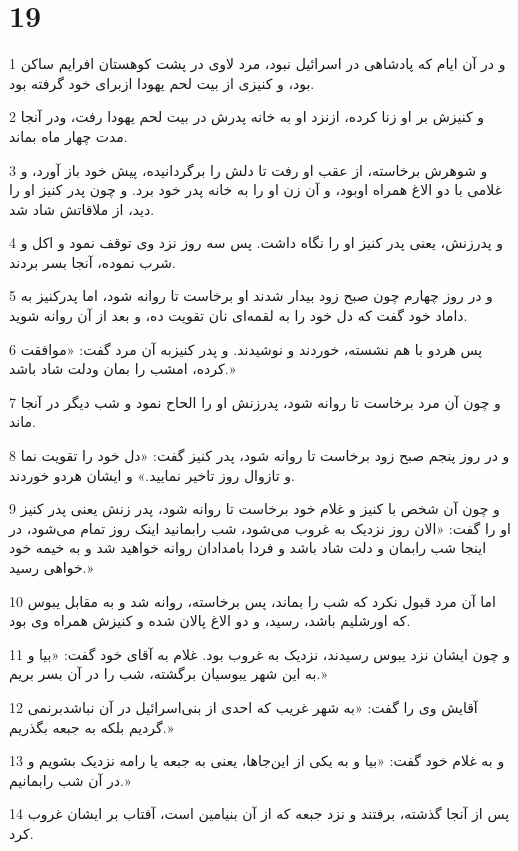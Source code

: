 \chapter{19}

\par 1 و در آن ایام که پادشاهی در اسرائیل نبود، مرد لاوی در پشت کوهستان افرایم ساکن بود، و کنیزی از بیت لحم یهودا ازبرای خود گرفته بود.
\par 2 و کنیزش بر او زنا کرده، ازنزد او به خانه پدرش در بیت لحم یهودا رفت، ودر آنجا مدت چهار ماه بماند.
\par 3 و شوهرش برخاسته، از عقب او رفت تا دلش را برگردانیده، پیش خود باز آورد، و غلامی با دو الاغ همراه اوبود، و آن زن او را به خانه پدر خود برد. و چون پدر کنیز او را دید، از ملاقاتش شاد شد.
\par 4 و پدرزنش، یعنی پدر کنیز او را نگاه داشت. پس سه روز نزد وی توقف نمود و اکل و شرب نموده، آنجا بسر بردند.
\par 5 و در روز چهارم چون صبح زود بیدار شدند او برخاست تا روانه شود، اما پدرکنیز به داماد خود گفت که دل خود را به لقمه‌ای نان تقویت ده، و بعد از آن روانه شوید.
\par 6 پس هردو با هم نشسته، خوردند و نوشیدند. و پدر کنیزبه آن مرد گفت: «موافقت کرده، امشب را بمان ودلت شاد باشد.»
\par 7 و چون آن مرد برخاست تا روانه شود، پدرزنش او را الحاح نمود و شب دیگر در آنجا ماند.
\par 8 و در روز پنجم صبح زود برخاست تا روانه شود، پدر کنیز گفت: «دل خود را تقویت نما و تازوال روز تاخیر نمایید.» و ایشان هردو خوردند.
\par 9 و چون آن شخص با کنیز و غلام خود برخاست تا روانه شود، پدر زنش یعنی پدر کنیز او را گفت: «الان روز نزدیک به غروب می‌شود، شب رابمانید اینک روز تمام می‌شود، در اینجا شب رابمان و دلت شاد باشد و فردا بامدادان روانه خواهید شد و به خیمه خود خواهی رسید.»
\par 10 اما آن مرد قبول نکرد که شب را بماند، پس برخاسته، روانه شد و به مقابل یبوس که اورشلیم باشد، رسید، و دو الاغ پالان شده و کنیزش همراه وی بود.
\par 11 و چون ایشان نزد یبوس رسیدند، نزدیک به غروب بود. غلام به آقای خود گفت: «بیا و به این شهر یبوسیان برگشته، شب را در آن بسر بریم.»
\par 12 آقایش وی را گفت: «به شهر غریب که احدی از بنی‌اسرائیل در آن نباشدبرنمی گردیم بلکه به جبعه بگذریم.»
\par 13 و به غلام خود گفت: «بیا و به یکی از این‌جاها، یعنی به جبعه یا رامه نزدیک بشویم و در آن شب رابمانیم.»
\par 14 پس از آنجا گذشته، برفتند و نزد جبعه که از آن بنیامین است، آفتاب بر ایشان غروب کرد.

